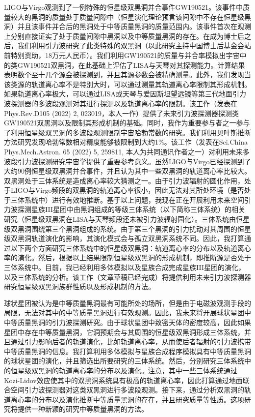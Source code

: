 \documentclass[12pt,a4paper,sans]{article}%
\begin{document}
\begin{CJK}{UTF8}{gbsn}
LIGO与Virgo观测到了一例特殊的恒星级双黑洞并合事件GW190521。该事件中质量较大的黑洞的质量处于质量间隙中（恒星演化理论预言该间隙中不存在恒星级黑洞）并且该事件并合后的黑洞处于中等质量黑洞的质量范围内。该事件首次在观测上分别直接证实了处于质量间隙中黑洞以及中等质量黑洞的存在。在成为博士后之后，我们利用引力波研究了此类特殊的双黑洞（以此研究主持中国博士后基金会站前特别资助，18万元人民币）。我们利用GW190521的质量与并合率模拟出宇宙中的类GW190521双黑洞，在此基础上评估了LISA与天琴对其探测能力。计算结果表明数个至十几个源会被探测到，并且其源参数会被精确测量。此外，我们发现当该类源的轨道离心率不是特别大时，可以通过测量其轨道离心率限制其形成机制。如果轨道离心率极大，可以通过LISA或天琴与爱因斯坦望远镜等第三代地面引力波探测器的多波段观测对其进行探测以及轨道离心率的限制。该工作（发表在Phys.Rev.D105 (2022) 2, 023019，本人一作）提供了未来引力波探测器探测类GW190521双黑洞以及限制其形成机制的基础。同时，我作为重要参与者之一参与了利用恒星级双黑洞的多波段观测限制宇宙哈勃常数的研究。我们利用贝叶斯推断方法研究发现哈勃常数相对精度能够被限制到大约1\%。该工作（发表在Sci.China Phys.Mech.Astron. 65 (2022) 5, 259811, 本人为共同通讯作者之一）对利用未来多波段引力波探测研究宇宙学提供了重要参考意义。虽然LIGO与Virgo已经探测到了大约90例恒星级双黑洞并合事件，并且认为其中一些双黑洞的轨道离心率比较大。双黑洞处于三体系统是造成离心率较大猜测之一。由于引力波辐射的圆化作用，处于LIGO与Virgo频段的双黑洞的轨道离心率很小，因此无法对其所处环境（是否处于三体系统中）进行有效地推断。基于以上问题，我现在正在开展利用未来空间引力波探测星族III星团中由黑洞组成的等级三体系统（以下简称三体系统）的相关研究（恒星级双黑洞在LISA与天琴频段还未被引力波辐射园化）。三体系统由恒星级双黑洞围绕第三个黑洞组成的系统。由于第三个黑洞的引力扰动对其周围的恒星级双黑洞轨道演化的影响，其演化模式会与孤立双黑洞系统不同。因此，我打算通过以下两个方面研究三体系统中的恒星级双黑洞：轨道离心率的分布以及轨道离心率的演化。然后，根据以上结果限制恒星级双黑洞的形成机制，即推断源是否处于三体系统中。目前，我已经利用多体模拟以及星族合成完成星族III星团的演化，以及三体系统的分析。该工作（文章草稿已经完成）将提供利用未来引力波探测器研究恒星级双黑洞族群性质以及形成机制的方法。

球状星团被认为是中等质量黑洞最有可能所处的场所，但是由于电磁波观测手段的局限，无法对其中的中等质量黑洞进行有效观测。因此，我未来将开展球状星团中中等质量黑洞的引力波探测研究。由于球状星团中致密天体的密度较高，因此如果星团中存在中等质量黑洞，它洞预期会与其周围的恒星级双黑洞形成三体系统，并且通过引力影响后者的轨道演化，比如轨道离心率，从而使后者辐射的引力波携带中等质量黑洞的信息。我打算利用多体模拟与星族合成程序模拟具有中等质量黑洞的球状星团的演化，并且筛选出所要研究的三体系统。然后，分别研究三体系统中的恒星级双黑洞的轨道离心率的分布以及演化。注意，其中一些三体系统通过Kozi-Lidov效应使其中的双黑洞系统具有极高的轨道离心率，因此打算通过地面联合空间引力波探测器对这类双黑洞进行多波段观测。接下来，通过分析双黑洞的轨道离心率的分布以及演化推断中等质量黑洞的存在，并且研究质量等性质。这项研究将提供一种新颖的研究中等质量黑洞的方法。


\end{CJK}
\end{document}
